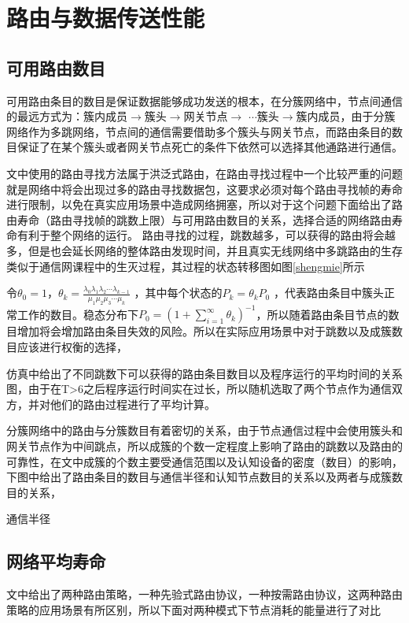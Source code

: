 \documentclass[a4paper,AutoFakeBold,oneside,12pt]{book}
\begin{document}
 \section{路由与数据传送性能}
  \subsection{可用路由数目}
  可用路由条目的数目是保证数据能够成功发送的根本，在分簇网络中，节点间通信的最远方式为：簇内成员$\to$簇头$\to$网关节点$\to$ $\cdots$簇头$\to$簇内成员，由于分簇网络作为多跳网络，节点间的通信需要借助多个簇头与网关节点，而路由条目的数目保证了在某个簇头或者网关节点死亡的条件下依然可以选择其他通路进行通信。
  
  文中使用的路由寻找方法属于洪泛式路由，在路由寻找过程中一个比较严重的问题就是网络中将会出现过多的路由寻找数据包，这要求必须对每个路由寻找帧的寿命进行限制，以免在真实应用场景中造成网络拥塞，所以对于这个问题下面给出了路由寿命（路由寻找帧的跳数上限）与可用路由数目的关系，选择合适的网络路由寿命有利于整个网络的运行。
  路由寻找的过程，跳数越多，可以获得的路由将会越多，但是也会延长网络的整体路由发现时间，并且真实无线网络中多跳路由的生存类似于通信网课程中的生灭过程，其过程的状态转移图如图\ref{shengmie}所示
 
  令$\theta_0=1$，$\theta_k=\frac{\lambda_0\lambda_1\lambda_2\cdots\lambda_{k-1}}{\mu_1\mu_2\mu_3\cdots\mu_k}$ ，其中每个状态的$P_k=\theta_k P_0$  ，代表路由条目中簇头正常工作的数目。稳态分布下$P_0=\left(1+\displaystyle\sum_{i=1}^{\infty}\theta_k\right)^{-1}$，所以随着路由条目节点的数目增加将会增加路由条目失效的风险。所以在实际应用场景中对于跳数以及成簇数目应该进行权衡的选择，
  
  仿真中给出了不同跳数下可以获得的路由条目数目以及程序运行的平均时间的关系图，由于在T>6之后程序运行时间实在过长，所以随机选取了两个节点作为通信双方，并对他们的路由过程进行了平均计算。

  分簇网络中的路由与分簇数目有着密切的关系，由于节点通信过程中会使用簇头和网关节点作为中间跳点，所以成簇的个数一定程度上影响了路由的跳数以及路由的可靠性，在文中成簇的个数主要受通信范围以及认知设备的密度（数目）的影响，下图中给出了路由条目的数目与通信半径和认知节点数目的关系以及两者与成簇数目的关系，
  
  通信半径
  \subsection{网络平均寿命}
  文中给出了两种路由策略，一种先验式路由协议，一种按需路由协议，这两种路由策略的应用场景有所区别，所以下面对两种模式下节点消耗的能量进行了对比
  
\end{document}
